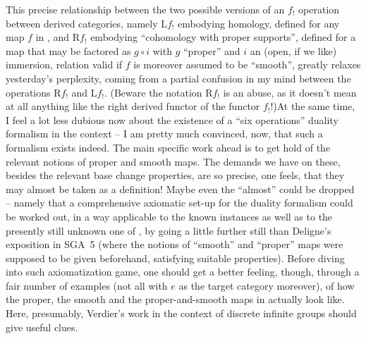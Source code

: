 This precise relationship between the two possible versions of an
$f_!$ operation between derived categories, namely $\mathrm Lf_!$
embodying homology, defined for any map $f$ in \Cat, and
$\mathrm Rf_!$ embodying ``cohomology with proper supports'', defined
for a map that may be factored as $g\circ i$ with $g$ ``proper'' and
$i$ an (open, if we like) immersion, relation valid if $f$ is moreover
assumed to be ``smooth'', greatly relaxes yesterday's perplexity,
coming from a partial confusion in my mind between the operations
$\mathrm Rf_!$ and $\mathrm Lf_!$. (Beware the notation $\mathrm Rf_!$
is an abuse, as it doesn't mean at all anything like the right derived
functor of the functor $f_!$!)\enspace At the same time, I feel a lot
less dubious now about the existence of a ``six operations'' duality
formalism in the \Cat{} context -- I am pretty much convinced, now,
that such a formalism exists indeed. The main specific work ahead is
to get hold of the relevant notions of proper and smooth maps. The
demands we have on these, besides the relevant base change
properties, are so precise, one feels, that they may almost be taken
as a definition! Maybe even the ``almost'' could be dropped -- namely
that a comprehensive axiomatic set-up for the duality formalism could
be worked out, in a way applicable to the known instances as well as
to the presently still unknown one of \Cat, by going a little further
still than Deligne's exposition in
SGA~5 (where the notions
of ``smooth'' and ``proper'' maps were supposed to be given
beforehand, satisfying suitable properties). Before diving into such
axiomatization game, one should get a better feeling, though, through
a fair number of examples (not all with $e$ as the target category
moreover), of how the proper, the smooth and the proper-and-smooth
maps in \Cat{} actually look like. Here, presumably, Verdier's work in
the context of discrete infinite groups should give useful clues.

